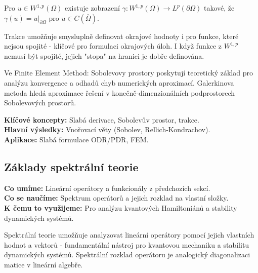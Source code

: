 \begin{definition}[Trakce]
Pro $u \in W^{1,p}(\Omega)$ existuje zobrazení $\gamma: W^{1,p}(\Omega) \to L^p(\partial\Omega)$ takové, že $\gamma(u) = u|_{\partial\Omega}$ pro $u \in C(\overline{\Omega})$.
\end{definition}

\begin{intuition}
Trakce umožňuje smysluplně definovat okrajové hodnoty i pro funkce, které nejsou spojité - klíčové pro formulaci okrajových úloh. I když funkce z $W^{1,p}$ nemusí být spojité, jejich "stopa" na hranici je dobře definována.
\end{intuition}

\begin{application}
Ve Finite Element Method: Sobolevovy prostory poskytují teoretický základ pro analýzu konvergence a odhadů chyb numerických aproximací. Galerkinova metoda hledá aproximace řešení v konečně-dimenzionálních podprostorech Sobolevových prostorů.
\end{application}

\begin{summary}
\textbf{Klíčové koncepty:} Slabá derivace, Sobolevův prostor, trakce. \\
\textbf{Hlavní výsledky:} Vnořovací věty (Sobolev, Rellich-Kondrachov). \\
\textbf{Aplikace:} Slabá formulace ODR/PDR, FEM.
\end{summary}

\spc

\subsection{Základy spektrální teorie}

\begin{scaffold}
\textbf{Co umíme:} Lineární operátory a funkcionály z předchozích sekcí. \\
\textbf{Co se naučíme:} Spektrum operátorů a jejich rozklad na vlastní složky. \\
\textbf{K čemu to využijeme:} Pro analýzu kvantových Hamiltoniánů a stability dynamických systémů.
\end{scaffold}

\begin{motivation}
Spektrální teorie umožňuje analyzovat lineární operátory pomocí jejich vlastních hodnot a vektorů - fundamentální nástroj pro kvantovou mechaniku a stabilitu dynamických systémů. Spektrální rozklad operátoru je analogický diagonalizaci matice v lineární algebře.
\end{motivation}

